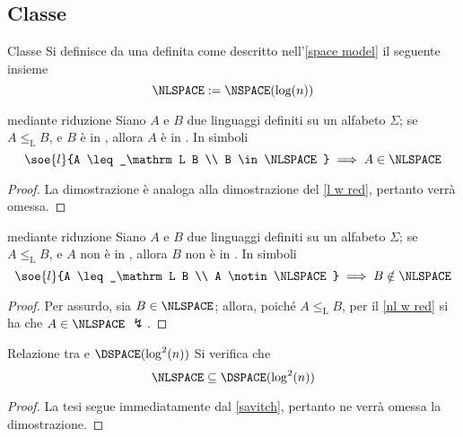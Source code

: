 \documentclass[a4paper, 12pt]{report}
\begin{document}
    \subsection{Classe \NLSPACE}

    \begin{frameddefn}{Classe \NLSPACE}
        Si definisce  da una \NTM definita come descritto nell'\cref{space model} il seguente insieme $$\NLSPACE := \NSPACE(\log(n))$$
    \end{frameddefn}
    
    \begin{framedthm}[label={nl w red}]{\NLSPACE mediante riduzione}
        Siano $A$ e $B$ due linguaggi definiti su un alfabeto $\Sigma$; se $A \leq_\mathrm L B$, e $B$ è in \NLSPACE, allora $A$ è in \NLSPACE. In simboli $$\soe{l}{A \leq_\mathrm L B \\ B \in \NLSPACE} \implies A \in \NLSPACE$$
    \end{framedthm}

    \begin{proof}
        La dimostrazione è analoga alla dimostrazione del \cref{l w red}, pertanto verrà omessa.
    \end{proof}

    \begin{framedcor}[label={nl w red cor}]{\NLSPACE mediante riduzione}
        Siano $A$ e $B$ due linguaggi definiti su un alfabeto $\Sigma$; se $A \leq_\mathrm L B$, e $A$ non è in \NLSPACE, allora $B$ non è in \NLSPACE. In simboli $$\soe{l}{A \leq_\mathrm L B \\ A \notin \NLSPACE} \implies B \notin \NLSPACE$$
    \end{framedcor}

    \begin{proof}
        Per assurdo, sia $B \in \NLSPACE$; allora, poiché $A \leq_\mathrm L B$, per il \cref{nl w red} si ha che $A \in \NLSPACE$ $\lightning$.
    \end{proof}

    \begin{framedprop}[label={nl in log sq}]{Relazione tra \NLSPACE e $\DSPACE(\log^2(n))$}
        Si verifica che $$\NLSPACE \subseteq \DSPACE(\log^2(n))$$
    \end{framedprop}

    \begin{proof}
        La tesi segue immediatamente dal \cref{savitch}, pertanto ne verrà omessa la dimostrazione.
    \end{proof}
\end{document}
